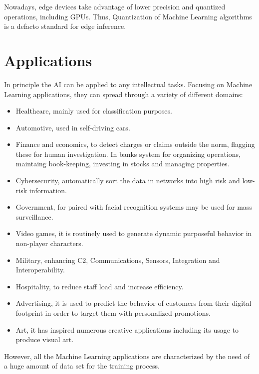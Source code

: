 Nowadays, edge devices take advantage of lower precision and quantized operations, including GPUs. Thus, Quantization of Machine Learning algorithms is a defacto standard for edge inference.

\section{Applications}
In principle the AI can be applied to any intellectual tasks. Focusing on Machine Learning applications, they can spread through a variety of different domains:
\begin{itemize}
\item Healthcare, mainly used for classification purposes.
\item Automotive, used in self-driving cars.
\item Finance and economics, to detect charges or claims outside the norm, flagging these for human investigation. In banks system for organizing operations, maintaing book-keeping, investing in stocks and managing properties.
\item Cybersecurity, automatically sort the data in networks into high risk and low-risk information.
\item Government, for paired with facial recognition systems may be used for mass surveillance.
\item Video games, it is routinely used to generate dynamic purposeful behavior in non-player characters.
\item Military, enhancing C2, Communications, Sensors, Integration and Interoperability.
\item Hospitality, to reduce staff load and increase efficiency.
\item Advertising, it is used to predict the behavior of customers from their digital footprint in order to target them with personalized promotions.
\item Art, it has inspired numerous creative applications including its usage to produce visual art.
\end{itemize}
However, all the Machine Learning applications are characterized by the need of a huge amount of data set for the training process.